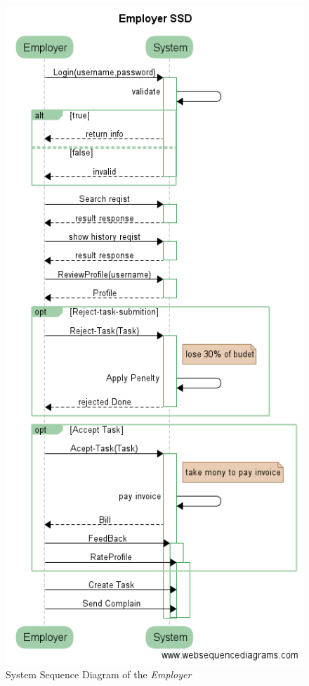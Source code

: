 \documentclass{article}
\begin{document}
\begin{figure}[ht!]
\centering
\includegraphics[width=128mm]{SystemSequanceEmployer-SSD}
\caption{System Sequence Diagram of the \textit{Employer}}
\end{figure}
\end{document}
